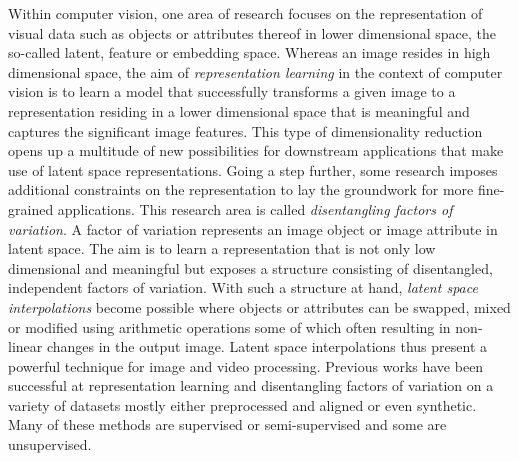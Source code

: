 \documentclass[12pt,a4paper]{article}
\begin{document}
Within computer vision, one area of research focuses on the representation of visual data such as objects or attributes thereof in lower dimensional space, the so-called latent, feature or embedding space. Whereas an image resides in high dimensional space, the aim of \textit{representation learning} in the context of computer vision is to learn a model that successfully transforms a given image to a representation residing in a lower dimensional space that is meaningful and captures the significant image features. This type of dimensionality reduction opens up a multitude of new possibilities for downstream applications that make use of latent space representations. Going a step further, some research imposes additional constraints on the representation to lay the groundwork for more fine-grained applications. This research area is called \textit{disentangling factors of variation}. A factor of variation represents an image object or image attribute in latent space. The aim is to learn a representation that is not only low dimensional and meaningful but exposes a structure consisting of disentangled, independent factors of variation. With such a structure at hand, \textit{latent space interpolations} become possible where objects or attributes can be swapped, mixed or modified using arithmetic operations some of which often resulting in non-linear changes in the output image. Latent space interpolations thus present a powerful technique for image and video processing. Previous works have been successful at representation learning and disentangling factors of variation on a variety of datasets mostly either preprocessed and aligned or even synthetic. Many of these methods are supervised or semi-supervised and some are unsupervised.
\end{document}

